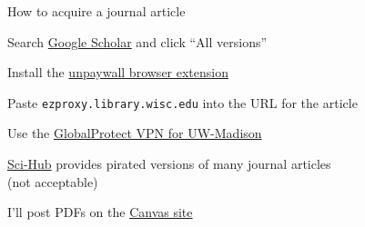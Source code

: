 \documentclass[aspectratio=169,12pt,t]{beamer}
\begin{document}
\begin{frame}[c]{How to acquire a journal article}

  \bbi
\item Search \href{https://scholar.google.com}{Google Scholar} and click ``All \uline{\hspace{2em}} versions''
\item Install the
  \href{https://unpaywall.org/products/extension}{unpaywall browser
    extension}
\item Paste {\tt ezproxy.library.wisc.edu} into the URL for the
  article
\item Use the
  \href{https://kb.wisc.edu/helpdesk/page.php?id=68164}{GlobalProtect
    VPN for UW-Madison}
\item \href{https://sci-hub.se}{Sci-Hub} provides pirated versions of many
  journal articles \\
  ({\vhilit not} acceptable)
\item I'll post PDFs on the \href{https://canvas.wisc.edu}{Canvas site}
  \ei

\end{frame}
\end{document}
